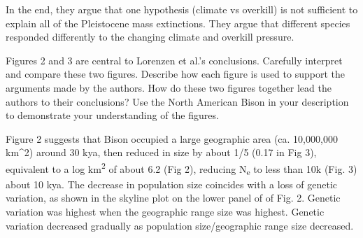 \documentclass[11pt]{exam}
\begin{document}
\begin{questions}
In the end, they argue that one hypothesis (climate vs overkill) is not sufficient to 
explain all of the Pleistocene mass extinctions. They argue that different species
responded differently to the changing climate and overkill pressure.
\else{}
\fi

\question[5]
Figures 2 and 3 are central to Lorenzen et al.'s conclusions.
Carefully interpret and compare these two figures. Describe how each
figure is used to support the arguments made by the authors. How do
these two figures together lead the authors to their conclusions? Use
the North American Bison in your description to demonstrate your
understanding of the figures. 

\ifprintanswers
Figure 2 suggests that Bison occupied a large geographic area (ca.
10,000,000 km\^{}2) around 30 kya, then reduced in size by about 1/5
(0.17 in Fig 3), equivalent to a log km\textsuperscript{2} of about 6.2
(Fig 2), reducing N\textsubscript{e} to less than 10k (Fig. 3) about 10
kya. The decrease in population size coincides with a loss of genetic
variation, as shown in the skyline plot on the lower panel of of Fig. 2.
Genetic variation was highest when the geographic range size was
highest. Genetic variation decreased gradually as population
size/geographic range size decreased.
\else{}
\fi

\end{questions}
\end{document}

